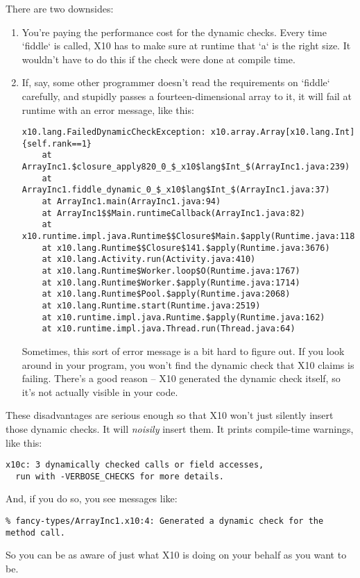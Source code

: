 There are two downsides: 
\begin{enumerate}
\item You're paying the performance cost for the dynamic checks.  Every time
      \xcd`fiddle` is called, X10 has to make sure at runtime that
      \xcd`a` is the right size.  It wouldn't have to do this if the check
      were done at compile time.
\item If, say, some other programmer doesn't read the requirements on
      \xcd`fiddle` carefully, and stupidly passes a
      fourteen-dimensional array to it, it will fail at runtime with an error
      message, like this: 
\begin{verbatim}
x10.lang.FailedDynamicCheckException: x10.array.Array[x10.lang.Int]{self.rank==1}
	at ArrayInc1.$closure_apply820_0_$_x10$lang$Int_$(ArrayInc1.java:239)
	at ArrayInc1.fiddle_dynamic_0_$_x10$lang$Int_$(ArrayInc1.java:37)
	at ArrayInc1.main(ArrayInc1.java:94)
	at ArrayInc1$$Main.runtimeCallback(ArrayInc1.java:82)
	at x10.runtime.impl.java.Runtime$$Closure$Main.$apply(Runtime.java:118)
	at x10.lang.Runtime$$Closure$141.$apply(Runtime.java:3676)
	at x10.lang.Activity.run(Activity.java:410)
	at x10.lang.Runtime$Worker.loop$O(Runtime.java:1767)
	at x10.lang.Runtime$Worker.$apply(Runtime.java:1714)
	at x10.lang.Runtime$Pool.$apply(Runtime.java:2068)
	at x10.lang.Runtime.start(Runtime.java:2519)
	at x10.runtime.impl.java.Runtime.$apply(Runtime.java:162)
	at x10.runtime.impl.java.Thread.run(Thread.java:64)
\end{verbatim}
Sometimes, this sort of error message is a bit hard to figure out.  
If you look around in your program, you won't find the dynamic check that
X10 claims is failing.  There's a good reason -- X10 generated the dynamic
check itself, so it's not actually visible in your code.  
\end{enumerate}

These disadvantages are serious enough so that X10 won't just silently insert
those dynamic checks.  It will {\em noisily} insert them.  It prints
compile-time warnings, like this:
\begin{verbatim}
x10c: 3 dynamically checked calls or field accesses, 
  run with -VERBOSE_CHECKS for more details.
\end{verbatim}
And, if you do so, you see messages like: 
\begin{verbatim}
% fancy-types/ArrayInc1.x10:4: Generated a dynamic check for the method call.
\end{verbatim}
So you can be as aware of just what X10 is doing on your behalf as you want to
be.  



